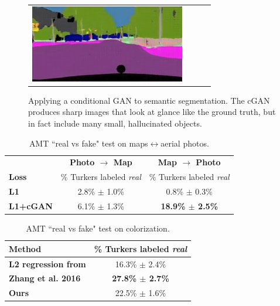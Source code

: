 \documentclass[10pt,twocolumn,letterpaper]{article}
\begin{document}
\begin{figure}[h]
\begin{tabular}{cccc}
\includegraphics[width=0.25\linewidth]{figs/cityscapes_image_to_labels_latex/cGAN_frankfurt_000000_004617_leftImg8bit.jpg}
\end{tabular} \egroup
\vspace{-0.1in}
\caption{Applying a conditional GAN to semantic segmentation. The cGAN produces sharp images that look at glance like the ground truth, but in fact include many small, hallucinated objects.}
\vspace{-0.2in}
\label{cityscapes_image_to_labels}
\end{figure}





\begin{table}
\centering
\scalebox{0.75} {
\begin{tabular}{lcc}
 & \textbf{Photo $\rightarrow$ Map}  &  \textbf{Map $\rightarrow$ Photo} \\
\textbf{Loss} & \% Turkers labeled \emph{real} & \% Turkers labeled \emph{real} \\
\hline
\textbf{L1} & 2.8\% $\pm$ 1.0\% & 0.8\% $\pm$ 0.3\% \\
\textbf{L1+cGAN} & 6.1\% $\pm$ 1.3\% & {\bf 18.9\% $\pm$ 2.5\%} \\
\end{tabular} }
\vspace{-0.1in}
\caption {AMT ``real vs fake" test on maps$\leftrightarrow$aerial photos.}
\vspace{-0.1in}
\label{tab:AMT_map2sat}
\end{table}


\begin{table}
\centering
\scalebox{0.75} {
\begin{tabular}{lc}
\textbf{Method} & \% Turkers labeled \emph{real} \\
\hline
\textbf{L2 regression from \cite{zhang2016colorful}} & 16.3\% $\pm$ 2.4\% \\
\textbf{Zhang et al. 2016 \cite{zhang2016colorful}} & \textbf{27.8\% $\pm$ 2.7\%} \\
\textbf{Ours} & 22.5\% $\pm$  1.6\% \\
\end{tabular} }
\vspace{-0.1in}
\caption {AMT ``real vs fake" test on colorization.}
\vspace{-0.1in}
\label{tab:AMT_colorization}
\end{table}
\end{document}
